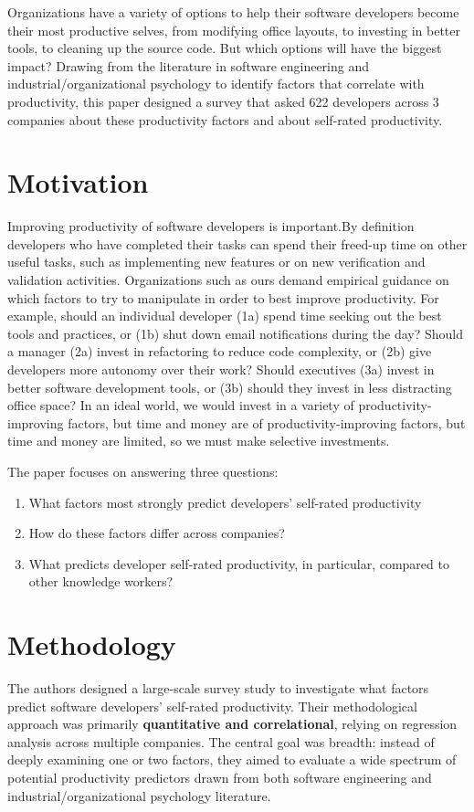 Organizations have a variety of options to help their software developers become their most productive selves, from modifying oﬃce layouts, to investing in better tools, to cleaning up the source code. But which options will have the biggest impact? Drawing from the literature in software engineering and industrial/organizational psychology to identify factors that correlate with productivity, this paper designed a survey that asked 622 developers across 3 companies about these productivity factors and about self-rated productivity.

\section{Motivation}
Improving productivity of software developers is important.By definition developers who have completed their tasks can spend their freed-up time on other useful tasks, such as implementing new features or on new verification and validation activities. Organizations such as ours demand empirical guidance
on which factors to try to manipulate in order to best improve productivity. For example, should an individual developer (1a) spend time seeking out the best tools and practices, or (1b) shut down email notifications during the day? Should a manager (2a) invest in refactoring to reduce code
complexity, or (2b) give developers more autonomy over their work? Should executives (3a) invest in better software development tools, or (3b) should they invest in less distracting oﬃce space? In an ideal world, we would invest in a variety of productivity-improving factors, but time and money are of productivity-improving factors, but time and money are limited, so we must make selective investments.

The paper focuses on answering three questions:
\begin{enumerate}
    \item What factors most strongly predict developers’ self-rated productivity
    \item How do these factors diﬀer across companies?
    \item What predicts developer self-rated productivity, in particular, compared to other knowledge workers?
\end{enumerate}

\section{Methodology}
The authors designed a large-scale survey study to investigate what factors predict software developers’ self-rated productivity. Their methodological approach was primarily \textbf{quantitative and correlational}, relying on regression analysis across multiple companies. The central goal was breadth: instead of deeply examining one or two factors, they aimed to evaluate a wide spectrum of potential productivity predictors drawn from both software engineering and industrial/organizational psychology literature.
